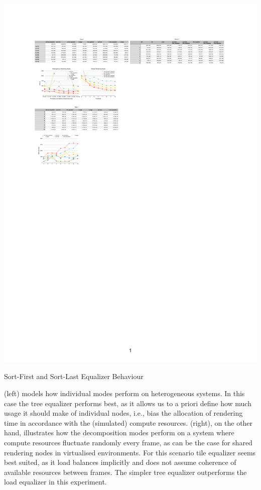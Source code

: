\begin{benchmark}[h!t]
  \includegraphics[width=\textwidth]{results/equalizers}
  \caption{\label{rEqualizers}Sort-First and Sort-Last Equalizer Behaviour}
\end{benchmark}

 (left) models how individual modes perform on heterogeneous
systems. In this case the tree equalizer performs best, as it allows us to a
priori define how much usage it should make of individual nodes, i.e., bias the
allocation of rendering time in accordance with the (simulated) compute
resources.  (right), on the other hand, illustrates how the
decomposition modes perform on a system where compute resources fluctuate
randomly every frame, as can be the case for shared rendering nodes in
virtualised environments. For this scenario tile equalizer seems best suited,
as it load balances implicitly and does not assume coherence of
available resources between frames. The simpler tree equalizer outperforms the
load equalizer in this experiment.

